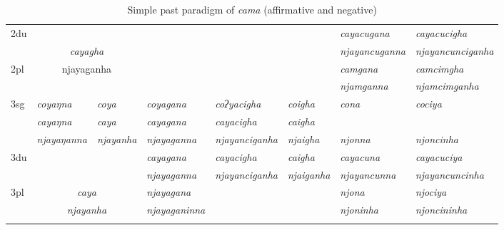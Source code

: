 \begin{landscape}
\begin{table}[p]
{\begin{tabular}{|l||p{2.4cm}|p{1.5cm}|p{2.4cm}|p{2.4cm}|p{2.4cm}|p{3.2cm}|p{3.2cm}|}
 \cline{1-2} \cline{7-8}			
{\sc 2du}		& \multicolumn{2}{c|}{}     & \multicolumn{3}{c|}{\cellcolor[gray]{.8}} & \it  cayacugana  & \it   cayacucigha \\
		& \multicolumn{2}{c|}{\it cayagha} & \multicolumn{3}{c|}{ \cellcolor[gray]{.8}}& \it njayancuganna  & \it  njayancunciganha \\
 \cline{1-1} \cline{7-8}			
{\sc 2pl}	& \multicolumn{2}{c|}{njayaganha} & \multicolumn{3}{c|}{\cellcolor[gray]{.8} }& \it  camgana& \it  camcimgha  \\
		& 	\multicolumn{2}{c|}{ }& \multicolumn{3}{c|}{\cellcolor[gray]{.8} }& \it  njamganna & \it  njamcimganha \\
\hline			
{\sc 3sg}	& \it coyaŋna	\ti  & \it 	 coya   \ti  	& \it   	coyagana		\ti & \it   coʔyacigha \ti  & \it   coigha \ti 	& \it cona & \it cociya \\
					& \it cayaŋna	  & \it 	      caya	& \it  cayagana 			& \it  cayacigha   & \it   caigha	& \it  & \it  \\
					& \it  njayaŋanna   & \it   njayanha 	& \it  njayaganna& \it  njayanciganha & \it  njaigha  & \it njonna& \it njoncinha\\
\hline
{\sc 3du }		&  \multicolumn{2}{c|}{}& \it cayagana& \it cayacigha & \it    caigha& \it   cayacuna & \it   cayacuciya\\
		& \multicolumn{2}{c|}{}& \it   	njayaganna	& \it njayanciganha	& \it  njaiganha& \it  njayancunna & \it njayancuncinha \\
 \cline{1-1} \cline{4-4} \cline{7-8}	
{\sc 3pl}		& \multicolumn{2}{c|}{\it caya}& \it njayagana& \it & \it  & \it njona& \it njociya\\	
	& \multicolumn{2}{c|}{\it  njayanha}			& \it njayaganinna& \it  & \it  & \it njoninha& \it njoncininha \\
\lspbottomrule
\end{tabular}
}

\caption{Simple past  paradigm of \emph{cama}  (affirmative and negative)}\label{par-cama-pst}
\end{table}



\end{landscape}
